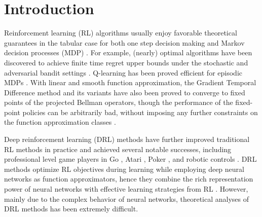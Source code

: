 \section{Introduction}
\label{sec:introduction}

Reinforcement learning (RL) algorithms usually enjoy favorable theoretical guarantees in the tabular case for both one step decision making and Markov decision processes (MDP) \citep{sutton2018reinforcement}.
For example, (nearly) optimal algorithms have been discovered to achieve finite time regret upper bounds under the stochastic and adversarial bandit settings \citep{bubeck2012regret}. Q-learning has been proved efficient for episodic MDPs \cite{jin2018q}. With linear and smooth function approximation, the Gradient Temporal Difference method and its variants have also been proved to converge to fixed points of the projected Bellman operators, though the performance of the fixed-point policies can be arbitrarily bad, without imposing any further constraints on the function approximation classes \citep{sutton2009fast,sutton2009convergent,bhatnagar2009convergent}.

Deep reinforcement learning (DRL) methods have further improved traditional RL methods in practice and achieved several notable successes, including professional level game players in Go \citep{silver2016masteringA,silver2017masteringB}, Atari \citep{mnih2015human}, Poker \citep{moravvcik2017deepstack}, and robotic controls \citep{lillicrap2015continuous,levine2016end}.
DRL methods optimize RL objectives during learning while employing deep neural networks as function approximators, hence they combine the rich representation power of neural networks with effective learning strategies from RL \citep{sutton2018reinforcement}. 
However, mainly due to the complex behavior of neural networks, theoretical analyses of DRL methods has been extremely difficult.


